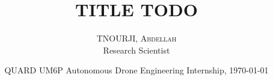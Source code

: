 \title[Short title here]{TITLE TODO}
\author{%
    {\textsc{TNOURJI, Abdellah}} \\[0.5ex]
    Research Scientist %
}
\date{QUARD UM6P Autonomous Drone Engineering Internship, \today} 

